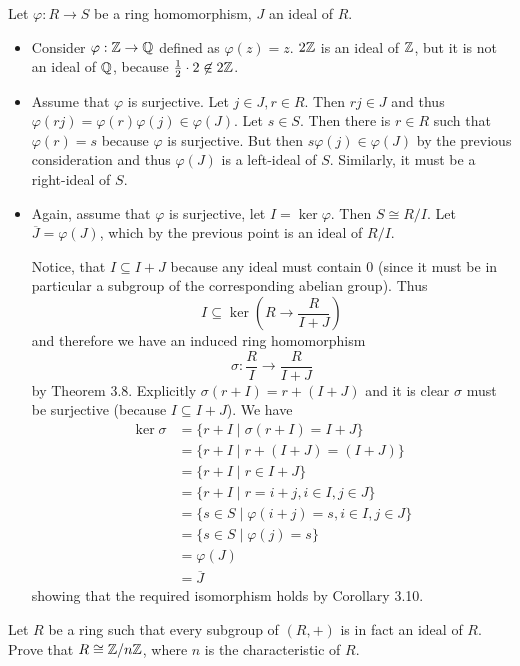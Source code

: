 \begin{solution}
	Let $\varphi: R \to S$ be a ring homomorphism, $J$ an ideal of $R$.
	\begin{itemize}
		\item Consider $\varphi: \mathbb{Z} \to \mathbb{Q}$ defined as $\varphi(z) = z$. $2\mathbb{Z}$ is an ideal of $\mathbb{Z}$, but it is not an ideal of $\mathbb{Q}$, because $\frac{1}{2} \cdot 2 \not\in 2\mathbb{Z}$.
		\item Assume that $\varphi$ is surjective. Let $j \in J, r \in R$. Then $rj \in J$ and thus $\varphi(rj) = \varphi(r)\varphi(j) \in \varphi(J)$. Let $s \in S$. Then there is $r \in R$ such that $\varphi(r) = s$ because $\varphi$ is surjective. But then $s\varphi(j) \in \varphi(J)$ by the previous consideration and thus $\varphi(J)$ is a left-ideal of $S$. Similarly, it must be a right-ideal of $S$.
		\item Again, assume that $\varphi$ is surjective, let $I = \ker \varphi$. Then $S \cong R/I$. Let $\overline{J} = \varphi(J)$, which by the previous point is an ideal of $R/I$.
		
		Notice, that $I \subseteq I + J$ because any ideal must contain $0$ (since it must be in particular a subgroup of the corresponding abelian group). Thus
		\[
			I \subseteq \ker(R \to \frac{R}{I + J})
		\]
		and therefore we have an induced ring homomorphism
		\[
			\sigma: \frac{R}{I} \to \frac{R}{I+J}
		\]
		by Theorem 3.8. Explicitly $\sigma(r + I) = r + (I + J)$ and it is clear $\sigma$ must be surjective (because $I \subseteq I + J$). We have
		\begin{align*}
			\ker \sigma &= \{ r + I \mid \sigma(r + I) = I + J \} \\
			&= \{ r + I \mid r + (I + J) = (I + J) \} \\
			&= \{ r + I \mid r \in I + J \} \\
			&= \{ r + I \mid r = i + j, i \in I, j \in J \} \\
			&= \{ s \in S \mid \varphi(i+j) = s, i \in I, j \in J \} \\
			&= \{ s \in S \mid \varphi(j) = s \} \\
			&= \varphi(J) \\
			&= \overline{J}
		\end{align*}
		showing that the required isomorphism holds by Corollary 3.10.
	\end{itemize}
\end{solution}

\begin{problem}
	Let $R$ be a ring such that every subgroup of $(R, +)$ is in fact an ideal of $R$. Prove that $R \cong \mathbb{Z}/n\mathbb{Z}$, where $n$ is the characteristic of $R$.
\end{problem}

